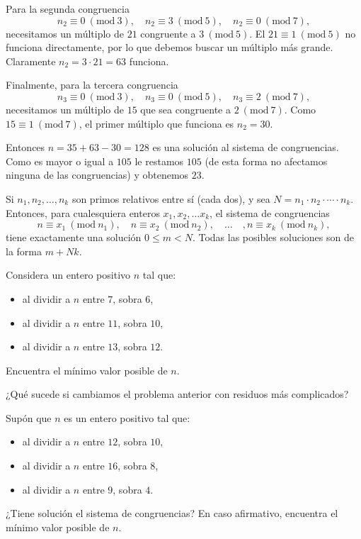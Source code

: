 Para la segunda congruencia $$n_2\equiv 0 ~(\mathrm {mod}~3), \quad n_2\equiv 3 ~(\mathrm {mod}~5), \quad n_2\equiv 0 ~(\mathrm {mod}~7),$$ necesitamos un múltiplo de $21$ congruente a $3 ~(\mathrm {mod}~5)$. El $21\equiv 1~(\mathrm {mod}~5)$ no funciona directamente, por lo que debemos buscar un múltiplo más grande. Claramente $n_2=3\cdot 21=63$ funciona.

Finalmente, para la tercera congruencia $$n_3\equiv 0 ~(\mathrm {mod}~3), \quad n_3\equiv 0 ~(\mathrm {mod}~5), \quad n_3\equiv 2 ~(\mathrm {mod}~7),$$ necesitamos un múltiplo de $15$ que sea congruente a $2 ~(\mathrm {mod}~7)$. Como $15\equiv 1~(\mathrm {mod}~7)$, el primer múltiplo que funciona es $n_2=30$.

Entonces $n=35+63-30=128$ es una solución al sistema de congruencias. Como es mayor o igual a $105$ le restamos $105$ (de esta forma no afectamos ninguna de las congruencias) y obtenemos $23$.

\begin{teorema}
Si $n_1,n_2,\dots, n_k$ son primos relativos entre sí (cada dos), y sea $N=n_1\cdot n_2 \cdot \cdots \cdot n_k$. Entonces, para cualesquiera enteros $x_1,x_2, \dots x_k$, el sistema de congruencias
$$n\equiv x_1 ~(\mathrm {mod}~n_1), \quad n\equiv x_2 ~(\mathrm {mod}~n_2), \quad \dots \quad  ,n\equiv x_k ~(\mathrm {mod}~n_k),$$
tiene exactamente una solución $0\leq m< N$. Todas las posibles soluciones son de la forma $m+Nk$.
\end{teorema}


\begin{ejercicio}
Considera un entero positivo $n$ tal que:  
\begin{itemize}
\item al dividir a $n$ entre $7$, sobra $6$,
\item al dividir a $n$ entre $11$, sobra $10$,
\item al dividir a $n$ entre $13$, sobra $12$.
\end{itemize}

Encuentra el mínimo valor posible de $n$.
\end{ejercicio}

\newpage
¿Qué sucede si cambiamos el problema anterior con residuos más complicados? 

\begin{ejercicio}
Supón que $n$ es un entero positivo tal que:  
\begin{itemize}
\item al dividir a $n$ entre $12$, sobra $10$,
\item al dividir a $n$ entre $16$, sobra $8$,
\item al dividir a $n$ entre $9$, sobra $4$.
\end{itemize}
¿Tiene solución el sistema de congruencias?
En caso afirmativo, encuentra el mínimo valor posible de $n$.
\end{ejercicio}

